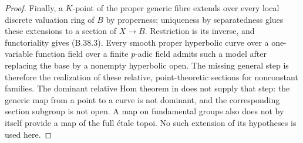 \begin{proof}
Finally, a $K$-point of the proper generic fibre
extends over every local discrete valuation ring of
$B$ by properness; uniqueness by separatedness glues
these extensions to a section of $X\to B$.
Restriction is its inverse, and functoriality gives
(B.38.3). Every smooth proper hyperbolic curve over a
one-variable function field over a finite $p$-adic
field admits such a model after replacing the base
by a nonempty hyperbolic open. The missing general
step is therefore the realization of these relative,
point-theoretic sections for nonconstant families.
The dominant relative Hom theorem in
\cite{F-HolzschuhSchmidtStix} does not supply that
step: the generic map from a point to a curve is not
dominant, and the corresponding section subgroup is
not open. A map on fundamental groups also does not
by itself provide a map of the full \'etale topoi.
No such extension of its hypotheses is used here.
\end{proof}

